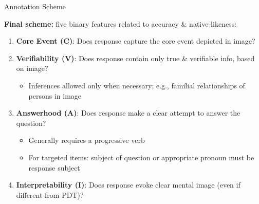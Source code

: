 \documentclass[final,14pt,t]{beamer}
\begin{document}
\begin{frame}{}
\begin{columns}[t]
\begin{column}{.33\linewidth}
\begin{minipage}[t][\textheight]{\linewidth}
\begin{block}{Annotation Scheme}
\begin{center}
\begin{minipage}{.85\textwidth}
\vspace{.5em}
\textbf{Final scheme:} five binary features related to accuracy \&
native-likeness: 
\vspace{.6em}
\begin{enumerate}
\item \textbf{Core Event (C)}: Does response capture the core event depicted in image?
\vspace{.6em}
\item \textbf{Verifiability (V)}: Does response contain only true \& verifiable info, based on image? 
\begin{itemize}
\vspace{.4em}
\item Inferences allowed only when necessary; e.g., familial relationships of persons in image
\end{itemize}
\vspace{.5em}
\item \textbf{Answerhood (A)}: Does response make a clear attempt to answer the question?
\begin{itemize}
\vspace{.4em}
\item Generally requires a progressive verb
\vspace{.4em}
\item For targeted items: subject of question or appropriate pronoun must be response subject
\end{itemize}
\vspace{.5em}
\item \textbf{Interpretability (I)}: Does response evoke clear mental image (even if different from PDT)? 
\begin{itemize}

\end{itemize}
\end{enumerate}
\end{minipage}
\end{center}
\end{block}
\end{minipage}
\end{column}
\end{columns}
\end{frame}
\end{document}
